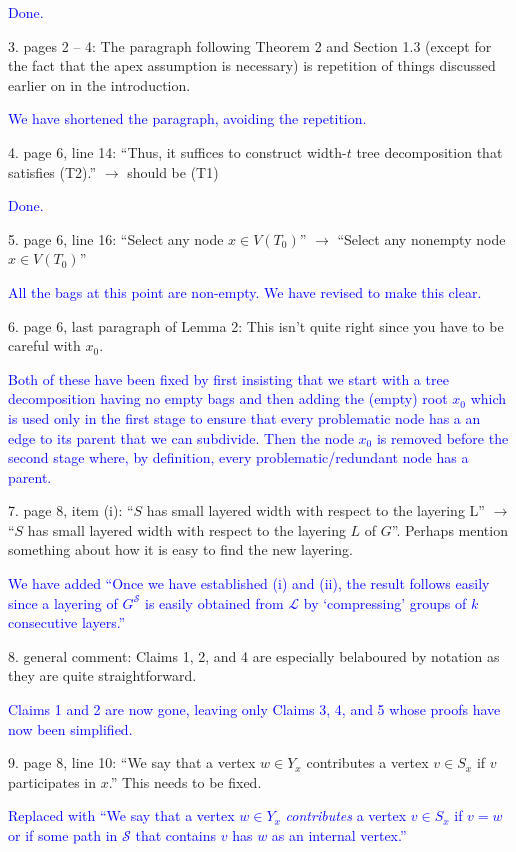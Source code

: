\documentclass[12pt]{article}
\newcommand{\done}{\textcolor{blue}{Done.}}
\begin{document}
\done

3. pages 2 – 4: The paragraph following Theorem 2 and Section 1.3
(except for the fact that the apex assumption is necessary) is repetition
of things discussed earlier on in the introduction.

\textcolor{blue}{We have shortened the paragraph, avoiding the repetition.}

4. page 6, line 14: ``Thus, it suffices to construct width-$t$ tree decomposition that satisfies (T2).'' $\longrightarrow$ should be (T1)

\done

5. page 6, line 16: ``Select any node $x \in V (T_0)$'' $\longrightarrow$ ``Select any nonempty node $x \in V (T_0)$''

\textcolor{blue}{All the bags at this point are non-empty. We have revised to make this clear. }

6. page 6, last paragraph of Lemma 2: This isn’t quite right since you
have to be careful with $x_0$.

\textcolor{blue}{Both of these have been fixed by first insisting that we start with a tree decomposition having no empty bags and then adding the (empty) root $x_0$ which is used only in the first stage to ensure that every problematic node has a an edge to its parent that we can subdivide.   Then the node $x_0$ is removed before the second stage where, by definition, every problematic/redundant node has a parent.} 

7. page 8, item (i): ``$S$ has small layered width with respect to the layering
L'' $\longrightarrow$ ``$S$ has small layered width with respect to the layering $L$ of
$G$''. Perhaps mention something about how it is easy to find the new layering.

\textcolor{blue}{We have added ``Once we have established (i) and (ii), the result follows easily since a layering of $G^\mathcal{S}$ is easily obtained from $\mathcal{L}$ by `compressing' groups of $k$ consecutive layers.''}

8. general comment: Claims 1, 2, and 4 are especially belaboured by
notation as they are quite straightforward.

\textcolor{blue}{Claims 1 and 2 are now gone, leaving only Claims 3, 4, and 5 whose proofs have now been simplified.}

9. page 8, line 10: ``We say that a vertex $w \in Y_x$ contributes a vertex
$v \in S_x$ if $v$ participates in $x$.'' This needs to be fixed.

\textcolor{blue}{Replaced with ``We say that a vertex $w\in Y_x$ \emph{contributes} a vertex $v\in S_x$ if $v=w$ or if some path in $\mathcal{S}$ that contains $v$ has $w$ as an internal vertex.''}
\end{document}
